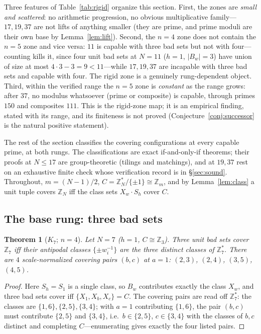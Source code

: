 \documentclass[11pt,a4paper]{article}
\numberwithin{equation}{section}
\theoremstyle{plain}
\newtheorem{theorem}{Theorem}[section]
\theoremstyle{definition}
\theoremstyle{remark}
\newcommand{\Z}{\mathbb{Z}}
\begin{document}
Three features of Table~\ref{tab:rigid} organize this section. First, the
zones are \emph{small and scattered}: no arithmetic progression, no
obvious multiplicative family---$17,19,37$ are not lifts of anything
smaller (they are prime, and prime moduli are their own base by
Lemma~\ref{lem:lift}). Second, the $n=4$ zone does not contain the $n=5$
zone and vice versa: $11$ is capable with three bad sets but not with
four---counting kills it, since four unit bad sets at $N=11$ ($h=1$,
$|B_w|=3$) have union of size at most $4\cdot 3-3=9<11$---while
$17,19,37$ are incapable with three bad sets and capable with four. The
rigid zone is a genuinely rung-dependent object. Third, within the
verified range the $n=5$ zone is \emph{constant} as the range grows:
after $37$, no modulus whatsoever (prime or composite) is capable, through
primes $150$ and composites $111$. This is the rigid-zone map; it is
an empirical finding, stated with its range, and its
finiteness is not proved (Conjecture~\ref{conj:successor} is the natural
positive statement).

The rest of the section classifies the covering configurations at every
capable prime, at both rungs. The classifications are exact
if-and-only-if theorems; their proofs at $N\le 17$ are group-theoretic
(tilings and matchings), and at $19,37$ rest on an exhaustive finite check
whose verification record is in \S\ref{sec:sound}. Throughout,
$m=(N-1)/2$, $C=\Z_N^\ast/\{\pm1\}\cong\Z_m$, and by
Lemma~\ref{lem:class} a unit tuple covers $\Z_N$ iff the class sets
$X_w\cdot S_h$ cover $C$.

\subsection{The base rung: three bad sets}\label{sec:K4}

\begin{theorem}[$K_7$; $n=4$]\label{thm:K4}
Let $N=7$ ($h=1$, $C\cong\Z_3$). Three unit bad sets cover $\Z_7$ iff
their antipodal classes $\{\pm w_i^{-1}\}$ are the three distinct classes
of $\Z_7^\ast$. There are $4$ scale-normalized covering pairs
$(b,c)$ at $a=1$: $(2,3)$, $(2,4)$, $(3,5)$, $(4,5)$.
\end{theorem}

\begin{proof}
Here $S_h=S_1$ is a single class, so $B_w$ contributes exactly the class
$X_w$, and three bad sets cover iff $\{X_1,X_b,X_c\}=C$. The covering
pairs are read off $\Z_7^\ast$: the classes are
$\{1,6\},\{2,5\},\{3,4\}$; with $a=1$ contributing $\{1,6\}$, the pair
$(b,c)$ must contribute $\{2,5\}$ and $\{3,4\}$, i.e.\
$b\in\{2,5\}$, $c\in\{3,4\}$ with the classes of $b,c$ distinct and
completing $C$---enumerating gives exactly the four listed pairs.
\end{proof}
\end{document}
